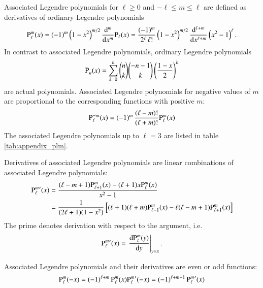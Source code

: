 Associated Legendre polynomials for $\ell\ge0$ and $-\ell\le m \le \ell$ are
defined as derivatives of ordinary Legendre polynomials
\begin{equation}
\label{appendix_sfun_assoclegendre}
{\text{P}_{\ell}^{m}}(x) = (-1)^m \left(1-x^2\right)^{m/2} \frac{\mathrm{d}^m}{\mathrm{d}x^m} \mathrm{P}_\ell(x) = \frac{(-1)^m}{2^\ell \, \ell!} \left(1-x^2\right)^{m/2} \frac{\mathrm{d}^{\ell+m}}{\mathrm{d}x^{\ell+m}} \left(x^2-1\right)^\ell.
\end{equation}
In contrast to associated Legendre polynomials, ordinary Legendre polynomials
\begin{equation}
\label{appendix_sfun_legendre}
{\text{P}_{n}^{}}(x) = \sum_{k=0}^n \binom{n}{k} \binom{-n-1}{k} \left(\frac{1-x}{2}\right)^k
\end{equation}
are actual polynomials.
Associated Legendre polynomials for negative values of $m$ are proportional
to the corresponding functions with positive $m$:
\begin{equation}
\label{eq:appendix_sfun_assoclegenmm}
{\text{P}_{\ell}^{-m}}(x) = (-1)^m\,\frac{(\ell-m)!}{(\ell+m)!} {\text{P}_{\ell}^{m}} (x)
\end{equation}
The associated Legendre polynomials up to $\ell=3$ are listed in table
\ref{tab:appendix_plm}.


Derivatives of associated Legendre polynomials are
linear combinations of associated Legendre polynomials:
\begin{align}
\label{eq:appendix_sfunc_assocderiv}
{\text{P}_{\ell}^{m}}^\prime(x) &= \frac{(\ell-m+1){\text{P}_{\ell+1}^{m}}(x) - (\ell+1)x{\text{P}_{\ell}^{m}}(x)}{x^2-1} \\
\label{eq:appendix_sfunc_assocderiv2}
&= \frac{1}{(2\ell+1)(1-x^2)} \left[(\ell+1)(\ell+m){\text{P}_{\ell-1}^{m}}(x)-\ell(\ell-m+1){\text{P}_{\ell+1}^{m}}(x)\right]
\end{align}
The prime denotes derivation with respect
to the argument, i.e.
\begin{equation}
{\text{P}_{\ell}^{m}}^\prime(x) = \left. \frac{\mathrm{d} {\text{P}_{\ell}^{m}}(y)}{\mathrm{d}y} \right|_{y=x}.
\end{equation}


Associated Legendre polynomials and their derivatives are even or odd functions:
\begin{equation}
\label{appendix_sfun_assoclegendre_parity}
{\text{P}_{\ell}^{m}}(-x) = (-1)^{\ell+m} \, {\text{P}_{\ell}^{m}}(x) \\
{\text{P}_{\ell}^{m}}^\prime(-x) = (-1)^{\ell+m+1} \, {\text{P}_{\ell}^{m}}^\prime(x)
\end{equation}

